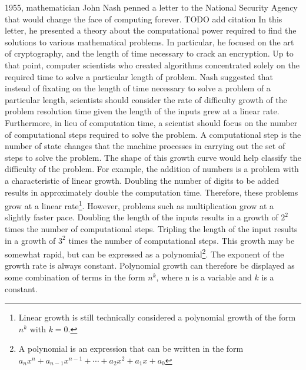 \documentclass[10pt,journal,compsoc]{IEEEtran}
\begin{document}
% 
% 
% 
% 
 1955, mathematician John Nash penned a letter to the National Security Agency that would change the face of computing forever. TODO add citation
In this letter, he presented a theory about the computational power required to find the solutions to various mathematical problems. In particular, he focused on the art of cryptography, and the length of time necessary to crack an encryption. Up to that point, computer scientists who created algorithms concentrated solely on the required time to solve a particular length of problem. Nash suggested that instead of fixating on the length of time necessary to solve a problem of a particular length, scientists should consider the rate of difficulty growth of the problem resolution time given the length of the inputs grew at a linear rate. Furthermore, in lieu of computation time, a scientist should focus on the number of computational steps required to solve the problem. A computational step is the number of state changes that the machine processes  in carrying out the set of steps to solve the problem. The shape of this growth curve would help classify the difficulty of the problem. For example, the addition of numbers is a problem with a characteristic of linear growth. Doubling the number of digits to be added results in approximately double the computation time. Therefore, these problems grow at a linear rate\footnote{Linear growth is still technically considered a polynomial growth of the form $n^k$ with $k=0$.}.  However, problems such as multiplication grow at a slightly faster pace. Doubling the length of the inputs results in a growth of $2^2$ times the number of computational steps. Tripling the length of the input  results in a growth of $3^2$ times the number of computational steps. This growth may be somewhat rapid, but can be expressed as a polynomial\footnote{A polynomial is an expression that can be written in the form $a_{n}x^{n}+a_{n-1}x^{n-1}+\dotsb +a_{2}x^{2}+a_{1}x+a_{0}$ }. The exponent of the growth rate is always constant. Polynomial growth can therefore be displayed as some combination of terms in the form $n^k$, where n is a variable and $k$ is a constant.
\end{document}
